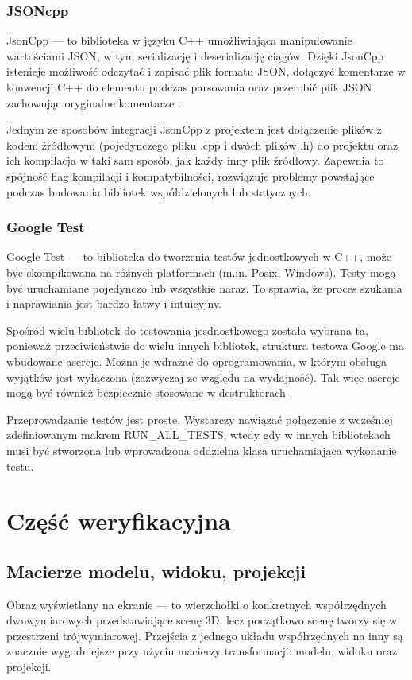 \subsubsection{JSONcpp}
JsonCpp --- to biblioteka w języku C++ umożliwiająca manipulowanie wartościami JSON, w tym serializację i deserializację ciągów. Dzięki JsonCpp istenieje możliwość odczytać i zapisać plik formatu JSON, dołączyć komentarze w konwencji C++ do elementu podczas parsowania oraz przerobić plik JSON zachowując oryginalne komentarze \cite{jsoncpp}.

Jednym ze sposobów integracji JsonCpp z projektem jest dołączenie plików z kodem źródłowym (pojedynczego pliku .cpp i dwóch plików .h) do projektu oraz ich kompilacja w taki sam sposób, jak każdy inny plik źródłowy. Zapewnia to spójność flag kompilacji i kompatybilności, rozwiązuje problemy powstające podczas budowania bibliotek współdzielonych lub statycznych. 

\subsubsection{Google Test}
Google Test --- to biblioteka do tworzenia testów jednostkowych w C++, może byc skompikowana na różnych platformach (m.in. Posix, Windows). Testy mogą być uruchamiane pojedynczo lub wszystkie naraz. To sprawia, że proces szukania i naprawiania jest bardzo łatwy i intuicyjny\cite{googleTest}.

Spośród wielu bibliotek do testowania jesdnostkowego została wybrana ta, ponieważ przeciwieństwie do wielu innych bibliotek, struktura testowa Google ma wbudowane asercje. Można je wdrażać do oprogramowania, w którym obsługa wyjątków jest wyłączona (zazwyczaj ze względu na wydajność). Tak więc asercje mogą być również bezpiecznie stosowane w destruktorach \cite{ibmGoogle}.

Przeprowadzanie testów jest proste. Wystarczy nawiązać połączenie z wcześniej zdefiniowanym makrem RUN\_ALL\_TESTS, wtedy gdy w innych bibliotekach musi być stworzona lub wprowadzona oddzielna klasa uruchamiająca wykonanie testu. 
\newpage
\section{Część weryfikacyjna}
\subsection{Macierze modelu, widoku, projekcji}
Obraz wyświetlany na ekranie --- to wierzchołki o konkretnych współrzędnych dwuwymiarowych przedstawiające scenę 3D, lecz początkowo scenę tworzy się w przestrzeni trójwymiarowej. Przejścia z jednego układu współrzędnych na inny są znacznie wygodniejsze przy użyciu macierzy transformacji: modelu, widoku oraz projekcji. 

